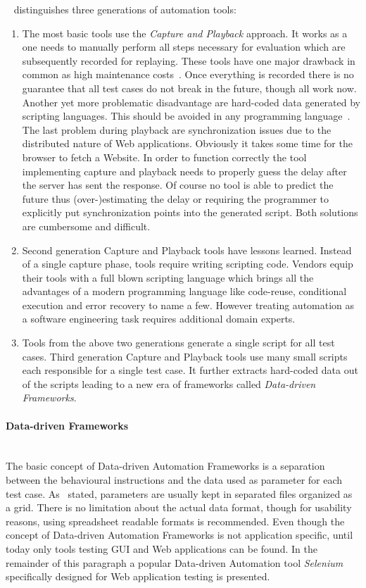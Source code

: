 \documentclass[12pt, notitlepage]{article}
\begin{document}
~\citet{kit} distinguishes three generations of automation tools:
\begin{enumerate}
	\item The most basic tools use the \textit{Capture and Playback} approach. It works as a one needs to manually perform all steps necessary for evaluation which
	are subsequently recorded for replaying.
	These tools have one major drawback in common as high maintenance costs~\cite{record-playback}. Once everything is recorded there is no guarantee that all
	test cases do not break in the future, though all work now. Another yet more problematic disadvantage are hard-coded data generated by
	scripting languages. This should be avoided in any programming language~\cite{automation-principles}. 
	The last problem during playback are synchronization issues due to the distributed nature of Web applications. Obviously it takes some time for the browser to
	fetch a Website. In order to function correctly the tool implementing capture and playback needs to properly guess the delay after the server has sent
	the response.
	Of course no tool is able to predict the future thus (over-)estimating the delay or requiring the programmer to explicitly put synchronization points
	into the generated script. Both solutions are cumbersome and difficult.
	\item Second generation Capture and Playback tools have lessons learned. Instead of a single capture phase, tools require writing scripting code. Vendors 
	equip their tools with a full blown scripting language which brings all the advantages of a modern programming language like code-reuse, conditional execution and
	error recovery to name a few. However treating automation as a software engineering task requires additional domain experts.
	\item Tools from the above two generations generate a single script for all test cases. Third generation Capture and Playback tools use many small scripts each 
	responsible for a single test case. It further extracts hard-coded data out of the scripts leading to a new era of frameworks called
	\textit{Data-driven Frameworks}. 
\end{enumerate} 
\paragraph{Data-driven Frameworks} ~\\
The basic concept of Data-driven Automation Frameworks is a separation between the behavioural instructions and the data used as parameter for each test case. 
As~\cite{record-playback} stated, parameters are usually kept in separated files organized as a grid. There is no limitation about the actual data format, though
for usability reasons, using spreadsheet readable formats is recommended. Even though the concept of Data-driven Automation Frameworks is not application specific, until today only tools testing GUI and Web applications can be found. In the remainder of this paragraph a popular Data-driven Automation
tool \textit{Selenium}~\cite{selenium} specifically designed for Web application testing is presented.
\end{document}
